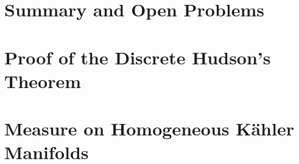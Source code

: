 \documentclass{unmeethesis}
\makeatletter
\renewcommand\backmatter{
    \def\chaptermark##1{\markboth{%
        \ifnum  \c@secnumdepth > \m@ne  \@chapapp\ \thechapter:  \fi  ##1}{%
        \ifnum  \c@secnumdepth > \m@ne  \@chapapp\ \thechapter:  \fi  ##1}}%
    \def\sectionmark##1{\relax}}
\makeatother
\begin{document}
\chapter{Summary and Open Problems}\label{ch:open-problems}


\backmatter
\begin{appendices}

\chapter{Proof of the Discrete Hudson's Theorem}\label{app:hudson}


\chapter{Measure on Homogeneous K{\"a}hler Manifolds}\label{app:kahler}


\end{appendices}




\end{document}
